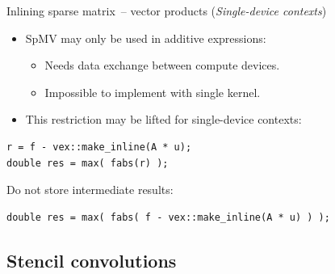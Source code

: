 \documentclass[@BEAMER_OPTIONS@]{beamer}
\newcommand{\singledevice}{\hspace{1cm}\footnotesize(\emph{Single-device contexts})}
\begin{document}

\begin{frame}[fragile]{Inlining sparse matrix~-- vector products \singledevice}
    \begin{itemize}
        \item SpMV may only be used in additive expressions:
            \begin{itemize}
                \item Needs data exchange between compute devices.
                \item Impossible to implement with single kernel.
            \end{itemize}
        \item This restriction may be lifted for single-device contexts:
    \end{itemize}
    \begin{exampleblock}{}
        \begin{lstlisting}[numbers=none]
r = f - vex::make_inline(A * u);
double res = max( fabs(r) );
        \end{lstlisting}
    \end{exampleblock}
    \pause
    \begin{exampleblock}{Do not store intermediate results:}
        \begin{lstlisting}[numbers=none]
double res = max( fabs( f - vex::make_inline(A * u) ) );
        \end{lstlisting}
    \end{exampleblock}
\end{frame}

\note{ }

\subsection{Stencil convolutions}
\end{document}
